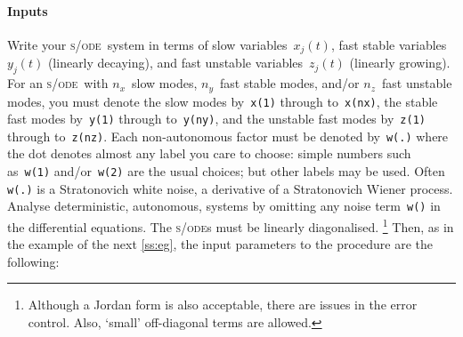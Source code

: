 \documentclass[11pt,a5paper]{article}
\def\sde{\textsc{s/ode}}
\begin{document}
\paragraph{Inputs}
Write your \sde\ system in terms of slow
variables~\(x_j(t)\), fast stable variables~\(y_j(t)\)
(linearly decaying), and fast unstable variables~\(z_j(t)\)
(linearly growing).  For an \sde\ with $n_x$~slow modes,
$n_y$~fast stable modes, and/or \(n_z\)~fast unstable modes,
you must denote the slow modes by~\verb|x(1)| through
to~\verb|x(nx)|, the stable fast modes by~\verb|y(1)|
through to~\verb|y(ny)|, and the unstable fast modes
by~\verb|z(1)| through to~\verb|z(nz)|. Each non-autonomous
factor must be denoted by~\verb|w(.)| where the dot denotes
almost any label you care to choose: simple numbers such
as~\verb|w(1)| and/or~\verb|w(2)| are the usual choices; but
other labels may be used. Often \verb|w(.)| is a
Stratonovich white noise, a derivative of a Stratonovich
Wiener process. Analyse deterministic, autonomous, systems
by omitting any noise term~\verb|w()| in the differential
equations. The \sde{}s must be linearly diagonalised.
\footnote{Although a Jordan form is also acceptable, there
are issues in the error control.  Also, `small' off-diagonal
terms are allowed.}  Then, as in the example of the next
\cref{ss:eg}, the input parameters to the procedure are the
following:
\end{document}
